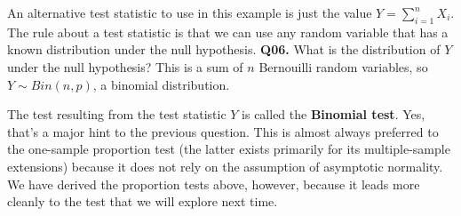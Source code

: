 \documentclass[12pt]{article}
\newcommand{\cblack}{\color{Black}}
\newcommand{\cblue}{\color{MidnightBlue}}
\begin{document}
An alternative test statistic to use in this example is just the value
$Y = \sum_{i=1}^n X_i$. The rule about a test statistic is that we can use any
random variable that has a known distribution under the null hypothesis. \textbf{Q06.}
What is the distribution of $Y$ under the null hypothesis? \cblue This is a sum of
$n$ Bernouilli random variables, so $Y \sim Bin(n, p)$, a binomial distribution. \cblack

The test resulting from the test statistic $Y$ is called the \textbf{Binomial test}.
Yes, that's a major hint to the previous question. This is almost always preferred to
the one-sample proportion test (the latter exists primarily for its multiple-sample
extensions) because it does not rely on the assumption of asymptotic normality. We have
derived the proportion tests above, however, because it leads more cleanly to the 
test that we will explore next time.
\end{document}
